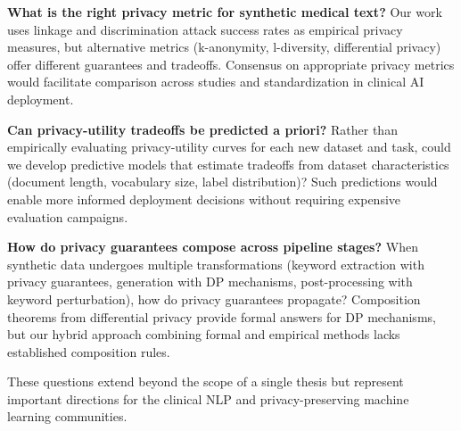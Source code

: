 \textbf{What is the right privacy metric for synthetic medical text?}
Our work uses linkage and discrimination attack success rates as empirical privacy measures, but alternative metrics (k-anonymity, l-diversity, differential privacy) offer different guarantees and tradeoffs.
Consensus on appropriate privacy metrics would facilitate comparison across studies and standardization in clinical AI deployment.

\textbf{Can privacy-utility tradeoffs be predicted a priori?}
Rather than empirically evaluating privacy-utility curves for each new dataset and task, could we develop predictive models that estimate tradeoffs from dataset characteristics (document length, vocabulary size, label distribution)?
Such predictions would enable more informed deployment decisions without requiring expensive evaluation campaigns.

\textbf{How do privacy guarantees compose across pipeline stages?}
When synthetic data undergoes multiple transformations (keyword extraction with privacy guarantees, generation with DP mechanisms, post-processing with keyword perturbation), how do privacy guarantees propagate?
Composition theorems from differential privacy provide formal answers for DP mechanisms, but our hybrid approach combining formal and empirical methods lacks established composition rules.

These questions extend beyond the scope of a single thesis but represent important directions for the clinical NLP and privacy-preserving machine learning communities.
